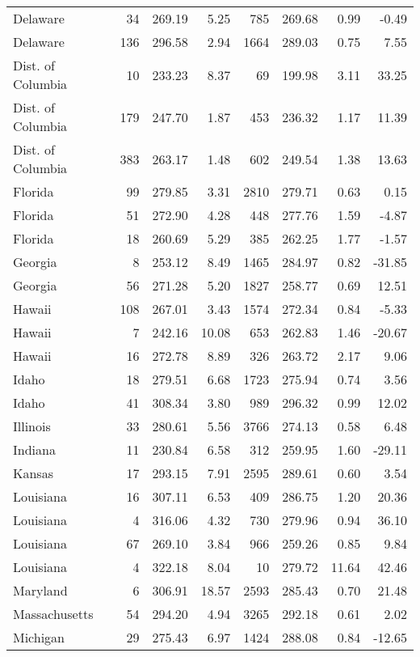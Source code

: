 \begin{longtable}{lrrr@{\extracolsep{10pt}}rrrr}
  Delaware &  34 & 269.19 & 5.25 & 785 & 269.68 & 0.99 & -0.49 \\ 
  Delaware & 136 & 296.58 & 2.94 & 1664 & 289.03 & 0.75 & 7.55 \\ 
  Dist. of Columbia &  10 & 233.23 & 8.37 &  69 & 199.98 & 3.11 & 33.25 \\ 
  Dist. of Columbia & 179 & 247.70 & 1.87 & 453 & 236.32 & 1.17 & 11.39 \\ 
  Dist. of Columbia & 383 & 263.17 & 1.48 & 602 & 249.54 & 1.38 & 13.63 \\ 
  Florida &  99 & 279.85 & 3.31 & 2810 & 279.71 & 0.63 & 0.15 \\ 
  Florida &  51 & 272.90 & 4.28 & 448 & 277.76 & 1.59 & -4.87 \\ 
  Florida &  18 & 260.69 & 5.29 & 385 & 262.25 & 1.77 & -1.57 \\ 
  Georgia &   8 & 253.12 & 8.49 & 1465 & 284.97 & 0.82 & -31.85 \\ 
  Georgia &  56 & 271.28 & 5.20 & 1827 & 258.77 & 0.69 & 12.51 \\ 
  Hawaii & 108 & 267.01 & 3.43 & 1574 & 272.34 & 0.84 & -5.33 \\ 
  Hawaii &   7 & 242.16 & 10.08 & 653 & 262.83 & 1.46 & -20.67 \\ 
  Hawaii &  16 & 272.78 & 8.89 & 326 & 263.72 & 2.17 & 9.06 \\ 
  Idaho &  18 & 279.51 & 6.68 & 1723 & 275.94 & 0.74 & 3.56 \\ 
  Idaho &  41 & 308.34 & 3.80 & 989 & 296.32 & 0.99 & 12.02 \\ 
  Illinois &  33 & 280.61 & 5.56 & 3766 & 274.13 & 0.58 & 6.48 \\ 
  Indiana &  11 & 230.84 & 6.58 & 312 & 259.95 & 1.60 & -29.11 \\ 
  Kansas &  17 & 293.15 & 7.91 & 2595 & 289.61 & 0.60 & 3.54 \\ 
  Louisiana &  16 & 307.11 & 6.53 & 409 & 286.75 & 1.20 & 20.36 \\ 
  Louisiana &   4 & 316.06 & 4.32 & 730 & 279.96 & 0.94 & 36.10 \\ 
  Louisiana &  67 & 269.10 & 3.84 & 966 & 259.26 & 0.85 & 9.84 \\ 
  Louisiana &   4 & 322.18 & 8.04 &  10 & 279.72 & 11.64 & 42.46 \\ 
  Maryland &   6 & 306.91 & 18.57 & 2593 & 285.43 & 0.70 & 21.48 \\ 
  Massachusetts &  54 & 294.20 & 4.94 & 3265 & 292.18 & 0.61 & 2.02 \\ 
  Michigan &  29 & 275.43 & 6.97 & 1424 & 288.08 & 0.84 & -12.65 \\ 

\end{longtable}
